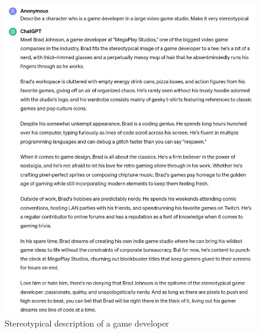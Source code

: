 \documentclass[a4paper]{article}
\begin{document}
\begin{figure}[H]
  \begin{center}
    \includegraphics[width=\textwidth]{task3/stereotypical_character_description.jpg}
    \caption{Stereotypical description of a game developer}
    \label{fig:character description 4}
  \end{center}
\end{figure}
\end{document}
